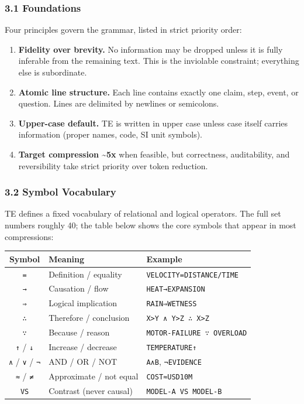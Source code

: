 \documentclass[
]{article}
\newcounter{none} %
\providecommand{\tightlist}{%
  \setlength{\itemsep}{0pt}\setlength{\parskip}{0pt}}
\begin{document}
\subsubsection{3.1 Foundations}\label{foundations}

Four principles govern the grammar, listed in strict priority order:

\begin{enumerate}
\def\labelenumi{\arabic{enumi}.}
\tightlist
\item
  \textbf{Fidelity over brevity.} No information may be dropped unless
  it is fully inferable from the remaining text. This is the inviolable
  constraint; everything else is subordinate.
\item
  \textbf{Atomic line structure.} Each line contains exactly one claim,
  step, event, or question. Lines are delimited by newlines or
  semicolons.
\item
  \textbf{Upper-case default.} TE is written in upper case unless case
  itself carries information (proper names, code, SI unit symbols).
\item
  \textbf{Target compression \textasciitilde5x} when feasible, but
  correctness, auditability, and reversibility take strict priority over
  token reduction.
\end{enumerate}

\subsubsection{3.2 Symbol Vocabulary}\label{symbol-vocabulary}

TE defines a fixed vocabulary of relational and logical operators. The
full set numbers roughly 40; the table below shows the core symbols that
appear in most compressions:

{\def\LTcaptype{none} %
\begin{longtable}[]{@{}cll@{}}
\toprule\noalign{}
Symbol & Meaning & Example \\
\midrule\noalign{}
\endhead
\bottomrule\noalign{}
\endlastfoot
\texttt{=} & Definition / equality & \texttt{VELOCITY=DISTANCE/TIME} \\
\texttt{→} & Causation / flow & \texttt{HEAT→EXPANSION} \\
\texttt{⇒} & Logical implication & \texttt{RAIN⇒WETNESS} \\
\texttt{∴} & Therefore / conclusion &
\texttt{X\textgreater{}Y\ ∧\ Y\textgreater{}Z\ ∴\ X\textgreater{}Z} \\
\texttt{∵} & Because / reason & \texttt{MOTOR-FAILURE\ ∵\ OVERLOAD} \\
\texttt{↑} / \texttt{↓} & Increase / decrease & \texttt{TEMPERATURE↑} \\
\texttt{∧} / \texttt{∨} / \texttt{¬} & AND / OR / NOT & \texttt{A∧B},
\texttt{¬EVIDENCE} \\
\texttt{≈} / \texttt{≠} & Approximate / not equal &
\texttt{COST≈USD10M} \\
\texttt{VS} & Contrast (never causal) & \texttt{MODEL-A\ VS\ MODEL-B} \\
\end{longtable}
}
\end{document}
